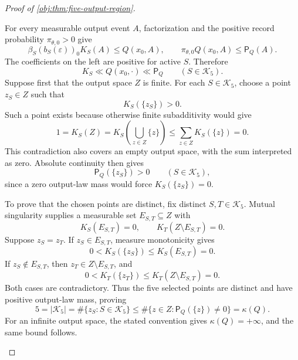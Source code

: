\begin{proof}[Proof of \cref{obj:thm:five-output-region}]
\begin{enumerate}
For every measurable output event \(A\), factorization
and the positive record probability \(\pi_{\theta,0}>0\) give
\[
\beta_S(b_S(\varepsilon))_0K_S(A)\le Q(x_0,A),
\qquad
\pi_{\theta,0}Q(x_0,A)\le\mathsf P_Q(A).
\]
The coefficients on the left are positive for active \(S\). Therefore
\[
K_S\ll Q(x_0,\cdot)\ll\mathsf P_Q
\qquad(S\in\mathcal K_5).
\]
Suppose first that the output space \(Z\) is finite. For each
\(S\in\mathcal K_5\), choose a point \(z_S\in Z\) such that
\[
K_S(\{z_S\})>0.
\]
Such a point exists because otherwise finite subadditivity would give
\[
1=K_S(Z)
=K_S\!\left(\bigcup_{z\in Z}\{z\}\right)
\le\sum_{z\in Z}K_S(\{z\})=0.
\]
This contradiction also covers an empty output space, with the sum
interpreted as zero. Absolute continuity then gives
\[
\mathsf P_Q(\{z_S\})>0\qquad(S\in\mathcal K_5),
\]
since a zero output-law mass would force \(K_S(\{z_S\})=0\).

To prove that the chosen points are distinct, fix distinct
\(S,T\in\mathcal K_5\). Mutual singularity supplies a measurable set
\(E_{S,T}\subseteq Z\) with
\[
K_S(E_{S,T})=0,\qquad K_T(Z\setminus E_{S,T})=0.
\]
Suppose \(z_S=z_T\). If \(z_S\in E_{S,T}\), measure monotonicity gives
\[
0<K_S(\{z_S\})\le K_S(E_{S,T})=0.
\]
If \(z_S\notin E_{S,T}\), then \(z_T\in Z\setminus E_{S,T}\), and
\[
0<K_T(\{z_T\})\le K_T(Z\setminus E_{S,T})=0.
\]
Both cases are contradictory. Thus the five selected points are distinct
and have positive output-law mass, proving
\[
5=|\mathcal K_5|
=\#\{z_S:S\in\mathcal K_5\}
\le
\#\{z\in Z:\mathsf P_Q(\{z\})\ne0\}
=\kappa(Q).
\]
For an infinite output space, the stated convention gives
\(\kappa(Q)=+\infty\), and the same bound follows.


\end{enumerate}
\end{proof}
